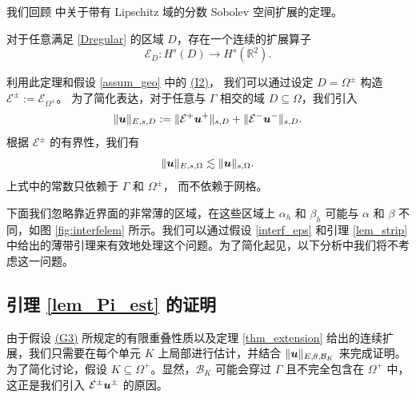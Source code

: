 我们回顾 \cite{stein1970singular,2015Zhou} 中关于带有 Lipschitz 域的分数 Sobolev 空间扩展的定理。
\begin{theorem}
\label{thm_extension}
对于任意满足 \eqref{Dregular} 的区域 \( D \)，存在一个连续的扩展算子
$$
\mathcal{E}_D : H^s(D) \longrightarrow H^s(\mathbb{R}^2) .
$$
\end{theorem}
利用此定理和假设 \ref{assum_geo} 中的 \hyperref[asp:I2]{(I2)}，
我们可以通过设定
$ D = \Omega^{\pm} $ 构造 $ \mathcal{E}^{\pm}:=\mathcal{E}_{\Omega^{\pm}}$。
为了简化表达，对于任意与
$ \Gamma $ 相交的域 $ D \subseteq \Omega $，我们引入
\begin{equation}
\label{Enorm}
\| \boldsymbol{u} \|_{E,s,D} := \|\mathcal{E}^+ \boldsymbol{u}^+ \|_{s,D} + \| \mathcal{E}^- \boldsymbol{u}^- \|_{s,D}.
\end{equation}
根据 $ \mathcal{E}^{\pm} $ 的有界性，我们有
\begin{equation}
\label{Enorm2}
\| \boldsymbol{u} \|_{E,s,\Omega} \lesssim \| \boldsymbol{u} \|_{s,\Omega}.
\end{equation}
上式中的常数只依赖于 $\Gamma$ 和 $\Omega^{\pm}$，
而不依赖于网格。

下面我们忽略靠近界面的非常薄的区域，在这些区域上 $ \alpha_h $ 和 $ \beta_h $
可能与 $ \alpha $ 和 $ \beta $ 不同，如图 \ref{fig:interfelem}
所示。我们可以通过假设 \ref{interf_eps} 和引理 \ref{lem_strip}
中给出的薄带引理来有效地处理这个问题。为了简化起见，以下分析中我们将不考虑这一问题。

\subsection{引理 \ref{lem_Pi_est} 的证明}
\label{subsec:lem_Pi_est}
由于假设 \hyperref[asp:polygonG3]{(G3)} 所规定的有限重叠性质以及定理
\ref{thm_extension} 给出的连续扩展，我们只需要在每个单元 \( K \)
上局部进行估计，并结合 \( \| \boldsymbol{u} \|_{E,\theta,\mathcal{B}_K} \)
来完成证明。为了简化讨论，假设 \( K \subseteq \Omega^+ \)。显然，\(
\mathcal{B}_K \) 可能会穿过 \( \Gamma \) 且不完全包含在 \( \Omega^{+} \)
中，这正是我们引入 \( \mathcal{E}^{\pm}\boldsymbol{u}^{\pm} \) 的原因。

